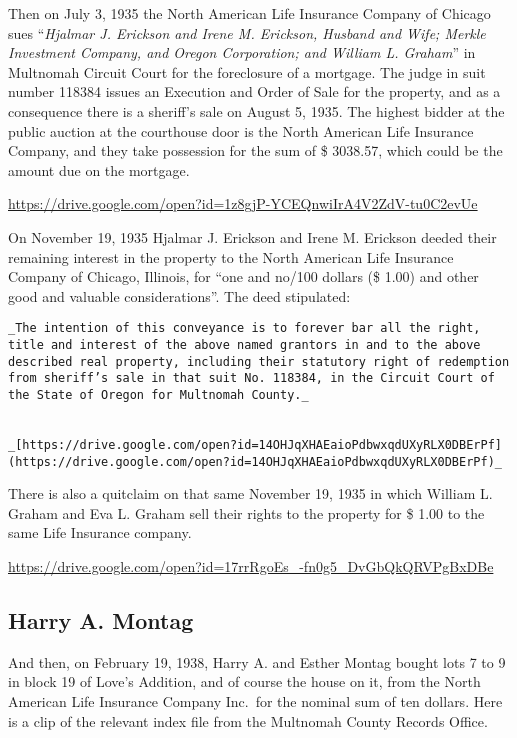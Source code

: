 \documentclass[
]{article}
\begin{document}
Then on July 3, 1935 the North American Life Insurance Company of
Chicago sues ``\emph{Hjalmar J. Erickson and Irene M. Erickson, Husband
and Wife; Merkle Investment Company, and Oregon Corporation; and William
L. Graham}'' in Multnomah Circuit Court for the foreclosure of a
mortgage. The judge in suit number 118384 issues an Execution and Order
of Sale for the property, and as a consequence there is a sheriff's sale
on August 5, 1935. The highest bidder at the public auction at the
courthouse door is the North American Life Insurance Company, and they
take possession for the sum of \$ 3038.57, which could be the amount due
on the mortgage.

\url{https://drive.google.com/open?id=1z8gjP-YCEQnwiIrA4V2ZdV-tu0C2evUe}

On November 19, 1935 Hjalmar J. Erickson and Irene M. Erickson deeded
their remaining interest in the property to the North American Life
Insurance Company of Chicago, Illinois, for ``one and no/100 dollars (\$
1.00) and other good and valuable considerations''. The deed stipulated:

\begin{verbatim}
_The intention of this conveyance is to forever bar all the right, title and interest of the above named grantors in and to the above described real property, including their statutory right of redemption from sheriff’s sale in that suit No. 118384, in the Circuit Court of the State of Oregon for Multnomah County._


_[https://drive.google.com/open?id=14OHJqXHAEaioPdbwxqdUXyRLX0DBErPf](https://drive.google.com/open?id=14OHJqXHAEaioPdbwxqdUXyRLX0DBErPf)_
\end{verbatim}

There is also a quitclaim on that same November 19, 1935 in which
William L. Graham and Eva L. Graham sell their rights to the property
for \$ 1.00 to the same Life Insurance company.

\url{https://drive.google.com/open?id=17rrRgoEs_-fn0g5_DvGbQkQRVPgBxDBe}

\hypertarget{harry-a.-montag}{%
\subsection{Harry A. Montag}\label{harry-a.-montag}}

And then, on February 19, 1938, Harry A. and Esther Montag bought lots 7
to 9 in block 19 of Love's Addition, and of course the house on it, from
the North American Life Insurance Company Inc.~for the nominal sum of
ten dollars. Here is a clip of the relevant index file from the
Multnomah County Records Office.
\end{document}
